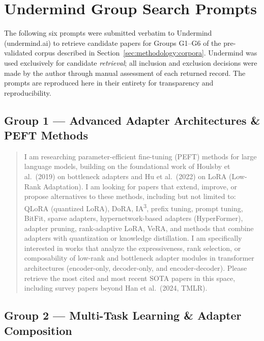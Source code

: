 
\section{Undermind Group Search Prompts}
\label{app:undermind}

The following six prompts were submitted verbatim to Undermind (undermind.ai) to
retrieve candidate papers for Groups G1--G6 of the pre-validated corpus described in
Section~\ref{sec:methodology:corpora}. Undermind was used exclusively for candidate
\textit{retrieval}; all inclusion and exclusion decisions were made by the author
through manual assessment of each returned record. The prompts are reproduced here
in their entirety for transparency and reproducibility.

\subsection*{Group 1 — Advanced Adapter Architectures \& PEFT Methods}
\label{app:undermind:g1}

\begin{quote}\small
I am researching parameter-efficient fine-tuning (PEFT) methods for large language
models, building on the foundational work of Houlsby et al.\ (2019) on bottleneck
adapters and Hu et al.\ (2022) on LoRA (Low-Rank Adaptation). I am looking for
papers that extend, improve, or propose alternatives to these methods, including but
not limited to: QLoRA (quantized LoRA), DoRA, IA\textsuperscript{3}, prefix tuning,
prompt tuning, BitFit, sparse adapters, hypernetwork-based adapters (HyperFormer),
adapter pruning, rank-adaptive LoRA, VeRA, and methods that combine adapters with
quantization or knowledge distillation. I am specifically interested in works that
analyze the expressiveness, rank selection, or composability of low-rank and bottleneck
adapter modules in transformer architectures (encoder-only, decoder-only, and
encoder-decoder). Please retrieve the most cited and most recent SOTA papers in this
space, including survey papers beyond Han et al.\ (2024, TMLR).
\end{quote}

\subsection*{Group 2 — Multi-Task Learning \& Adapter Composition}
\label{app:undermind:g2}

